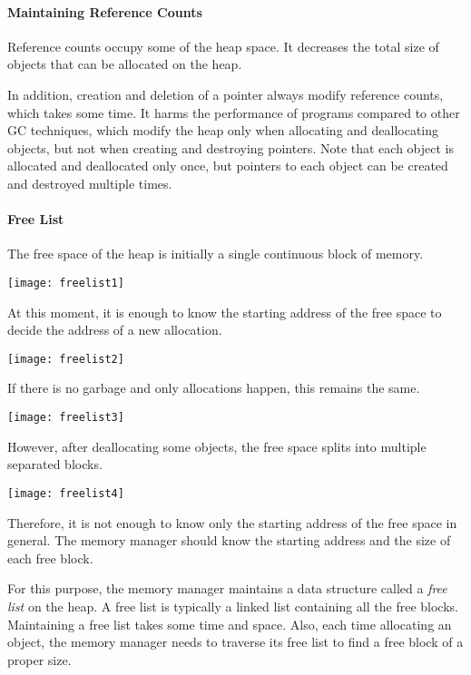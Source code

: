 \paragraph{Maintaining Reference Counts}

Reference counts occupy some of the heap space. It decreases the total size of
objects that can be allocated on the heap.

In addition, creation and deletion of a pointer always modify reference counts,
which takes some time. It harms the performance of programs compared to other GC
techniques, which modify the heap only when allocating and deallocating
objects, but not when creating and destroying pointers. Note that each object is
allocated and deallocated only once, but pointers to each object can be created
and destroyed multiple times.

\paragraph{Free List}

The free space of the heap is initially a single continuous block of memory.

\begin{center}
\texttt{[image: freelist1]}
\end{center}

At this moment, it is enough to know the starting address of the free space to
decide the address of a new allocation.

\begin{center}
\texttt{[image: freelist2]}
\end{center}

If there is no garbage and only allocations happen, this remains the same.

\begin{center}
\texttt{[image: freelist3]}
\end{center}

However, after deallocating some objects, the free space splits into multiple
separated blocks.

\begin{center}
\texttt{[image: freelist4]}
\end{center}

Therefore, it is not enough to know only the starting address of the free space
in general. The memory manager should know the starting address and the size of
each free block.

For this purpose, the memory manager maintains a data structure called a
\textit{free list} on the heap. A free list is typically a
linked list containing all the free blocks. Maintaining a free list takes some
time and space. Also, each time allocating an object, the memory manager needs to
traverse its free list to find a free block of a proper size.

